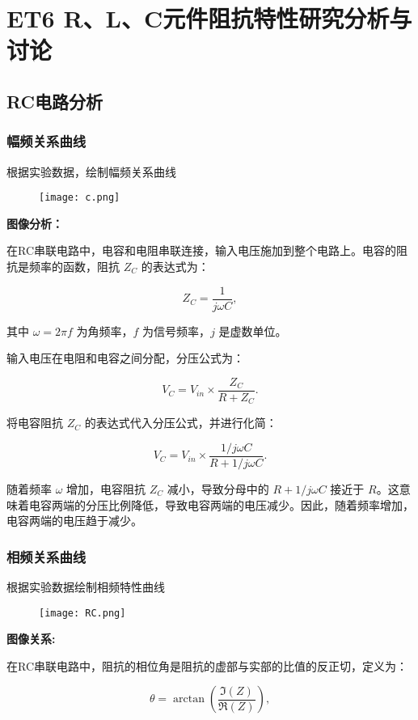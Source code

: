 \documentclass[dvipsnames, svgnames,a4paper,11pt]{article}
\begin{document}
	\section{ET6 R、L、C元件阻抗特性研究\quad\heiti 分析与讨论}
	
	\subsection{RC电路分析}
	\subsubsection{幅频关系曲线}
	根据实验数据，绘制幅频关系曲线
\begin{figure}[{H}]
	\centering
	\texttt{[image: c.png]}

	\label{}
\end{figure}
\textbf{图像分析：}

在RC串联电路中，电容和电阻串联连接，输入电压施加到整个电路上。电容的阻抗是频率的函数，阻抗 \( Z_C \) 的表达式为：

\[
Z_C = \frac{1}{j\omega C},
\]

其中 \( \omega = 2\pi f \) 为角频率，\( f \) 为信号频率，\( j \) 是虚数单位。

输入电压在电阻和电容之间分配，分压公式为：

\[
V_C = V_{in} \times \frac{Z_C}{R + Z_C}.
\]

将电容阻抗 \( Z_C \) 的表达式代入分压公式，并进行化简：

\[
V_C = V_{in} \times \frac{1/j\omega C}{R + 1/j\omega C}.
\]

随着频率 \( \omega \) 增加，电容阻抗 \( Z_C \) 减小，导致分母中的 \( R + 1/j\omega C \) 接近于 \( R \)。这意味着电容两端的分压比例降低，导致电容两端的电压减少。因此，随着频率增加，电容两端的电压趋于减少。
\subsubsection{相频关系曲线}
根据实验数据绘制相频特性曲线
\begin{figure}[{H}]
	\centering
	\texttt{[image: RC.png]}
	
	\label{}
\end{figure}
\textbf{图像关系:}

在RC串联电路中，阻抗的相位角是阻抗的虚部与实部的比值的反正切，定义为：

\[
\theta = \arctan\left( \frac{\Im(Z)}{\Re(Z)} \right),
\]
\end{document}
